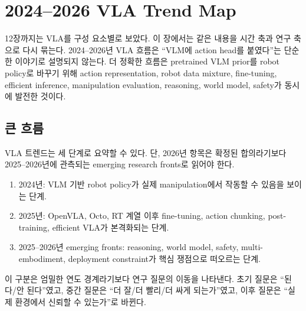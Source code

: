 \chapter{2024--2026 VLA Trend Map}
\label{ch:trend_map}

12장까지는 VLA를 구성 요소별로 보았다. 이 장에서는 같은 내용을 시간 축과 연구 축으로 다시 묶는다. 2024--2026년 VLA 흐름은 ``VLM에 action head를 붙였다''는 단순한 이야기로 설명되지 않는다. 더 정확한 흐름은 pretrained VLM prior를 robot policy로 바꾸기 위해 action representation, robot data mixture, fine-tuning, efficient inference, manipulation evaluation, reasoning, world model, safety가 동시에 발전한 것이다.

\section{큰 흐름}

VLA 트렌드는 세 단계로 요약할 수 있다. 단, 2026년 항목은 확정된 합의라기보다 2025--2026년에 관측되는 emerging research fronts로 읽어야 한다.

\begin{enumerate}
  \item 2024년: VLM 기반 robot policy가 실제 manipulation에서 작동할 수 있음을 보이는 단계.
  \item 2025년: OpenVLA, Octo, RT 계열 이후 fine-tuning, action chunking, post-training, efficient VLA가 본격화되는 단계.
  \item 2025--2026년 emerging fronts: reasoning, world model, safety, multi-embodiment, deployment constraint가 핵심 쟁점으로 떠오르는 단계.
\end{enumerate}

이 구분은 엄밀한 연도 경계라기보다 연구 질문의 이동을 나타낸다. 초기 질문은 ``된다/안 된다''였고, 중간 질문은 ``더 잘/더 빨리/더 싸게 되는가''였고, 이후 질문은 ``실제 환경에서 신뢰할 수 있는가''로 바뀐다.

